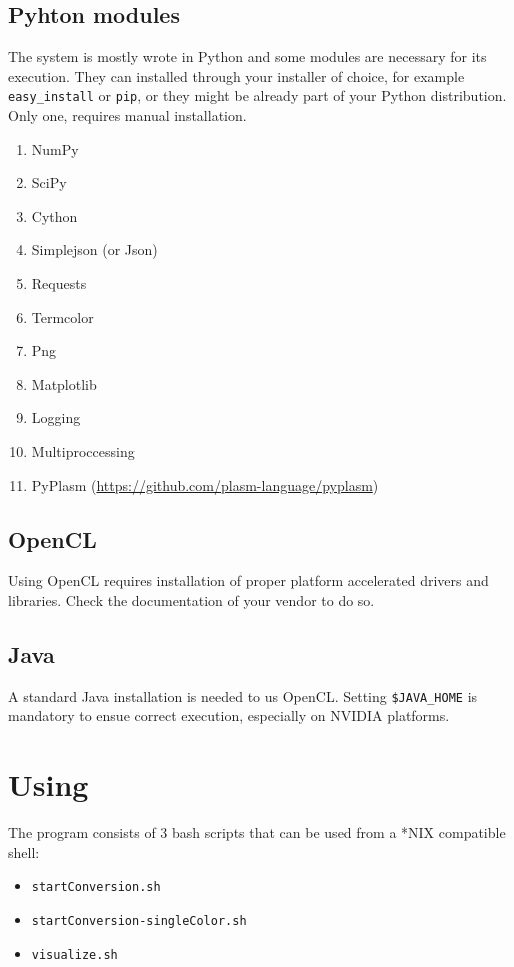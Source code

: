 \documentclass[a4paper,twoside,10pt]{report}
\begin{document}
\section{Pyhton modules}
The system is mostly wrote in Python and some modules are necessary for its execution. They can installed through your installer of choice, for example \texttt{easy\_install} or \texttt{pip}, or they might be already part of your Python distribution. Only one, requires manual installation.

\begin{enumerate}
\item NumPy
\item SciPy
\item Cython
\item Simplejson (or Json)
\item Requests
\item Termcolor
\item Png
\item Matplotlib
\item Logging
\item Multiproccessing
\item PyPlasm (\url{https://github.com/plasm-language/pyplasm})
\end{enumerate}

\section{OpenCL}
Using OpenCL requires installation of proper platform accelerated drivers and libraries. Check the documentation of your vendor to do so.

\section{Java}
A standard Java installation is needed to us OpenCL. Setting \texttt{\$JAVA\_HOME} is mandatory to ensue correct execution, especially on NVIDIA platforms.

\chapter{Using}\label{using}
The program consists of 3 bash scripts that can be used from a *NIX compatible shell:
\begin{itemize}
	\item \texttt{startConversion.sh}
	\item \texttt{startConversion-singleColor.sh}
	\item \texttt{visualize.sh}
\end{itemize}
\end{document}
